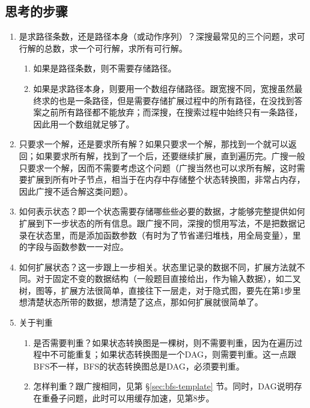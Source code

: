 \subsection{思考的步骤}
\begin{enumerate}
	\item 是求路径条数，还是路径本身（或动作序列）？深搜最常见的三个问题，求可行解的总数，求一个可行解，求所有可行解。
	\begin{enumerate}
		\item 如果是路径条数，则不需要存储路径。
		\item 
		如果是求路径本身，则要用一个数组存储路径。跟宽搜不同，宽搜虽然最终求的也是一条路径，但是需要存储扩展过程中的所有路径，在没找到答案之前所有路径都不能放弃；而深搜，在搜索过程中始终只有一条路径，因此用一个数组就足够了。
	\end{enumerate}
	
	\item 
	只要求一个解，还是要求所有解？如果只要求一个解，那找到一个就可以返回；如果要求所有解，找到了一个后，还要继续扩展，直到遍历完。广搜一般只要求一个解，因而不需要考虑这个问题（广搜当然也可以求所有解，这时需要扩展到所有叶子节点，相当于在内存中存储整个状态转换图，非常占内存，因此广搜不适合解这类问题）。
	
	\item 
	如何表示状态？即一个状态需要存储哪些些必要的数据，才能够完整提供如何扩展到下一步状态的所有信息。跟广搜不同，深搜的惯用写法，不是把数据记录在状态里，而是添加函数参数（有时为了节省递归堆栈，用全局变量），里的字段与函数参数一一对应。
	
	\item 
	如何扩展状态？这一步跟上一步相关。状态里记录的数据不同，扩展方法就不同。对于固定不变的数据结构（一般题目直接给出，作为输入数据），如二叉树，图等，扩展方法很简单，直接往下一层走，对于隐式图，要先在第1步里想清楚状态所带的数据，想清楚了这点，那如何扩展就很简单了。
	
	\item 关于判重
	\begin{enumerate}
		\item 是否需要判重？如果状态转换图是一棵树，则不需要判重，因为在遍历过程中不可能重复；如果状态转换图是一个DAG，则需要判重。这一点跟BFS不一样，BFS的状态转换图总是DAG，必须要判重。
		\item 怎样判重？跟广搜相同，见第 \S \ref{sec:bfs-template} 节。同时，DAG说明存在重叠子问题，此时可以用缓存加速，见第8步。
	\end{enumerate}
	

\end{enumerate}
